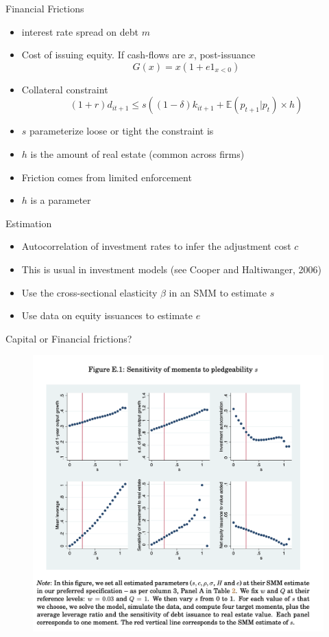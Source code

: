 \documentclass[english,xcolor=svgnames]{beamer}
\begin{document}
\begin{frame}{Financial Frictions}
\begin{itemize}
\item interest rate spread on debt $m$
\item Cost of issuing equity. If cash-flows are $x$, post-issuance
\[G(x) = x(1 + e 1_{x < 0})\]
\item Collateral constraint
\[(1+r) d_{it+1} \leq s((1-\delta) k_{it+1} + \mathbb{E}(p_{t+1}|p_t) \times h)\]
\item $s$ parameterize loose or tight the constraint is
\item $h$ is the amount of real estate (common across firms)
\item Friction comes from limited enforcement
\item $h$ is a parameter
\end{itemize}
\end{frame}

\begin{frame}{Estimation}
\begin{itemize}
\item Autocorrelation of investment rates to infer the adjustment cost $c$
\item This is usual in investment models (see Cooper and Haltiwanger, 2006)
\item Use the cross-sectional elasticity $\beta$ in an SMM to estimate $s$
\item Use data on equity issuances to estimate $e$
\end{itemize}
\end{frame}

\begin{frame}{Capital or Financial frictions?}
\begin{figure}
\includegraphics[scale=0.35]{figures/cchst_1}
\end{figure}
\end{frame}
\end{document}
